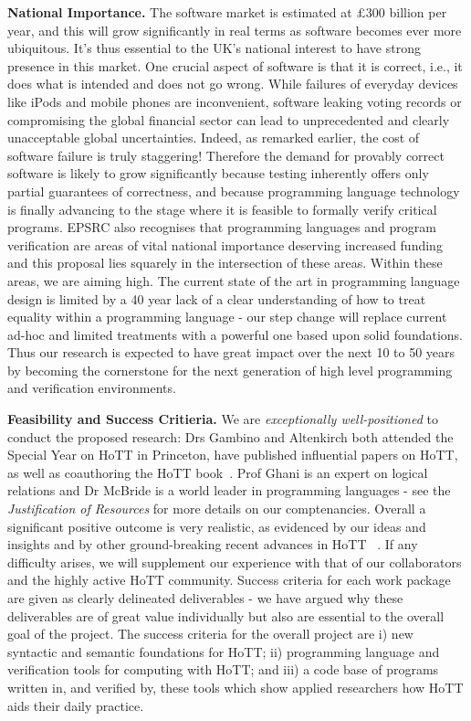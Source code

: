 \documentclass[a4paper,11pt]{article}
\begin{document}
{\bf National Importance.} The software market is estimated at
$\pounds 300$ billion per year, and this will grow significantly in
real terms as software becomes ever more ubiquitous. It's thus
essential to the UK's national interest to have strong presence in
this market. One crucial aspect of software is that it is correct,
i.e., it does what is intended and does not go wrong.  While failures of
everyday devices like iPods and mobile phones are inconvenient,
software leaking voting records or compromising the global financial
sector can lead to unprecedented and clearly unacceptable global
uncertainties. Indeed, as remarked earlier, the cost of software failure is
truly staggering!  Therefore the
demand for provably correct software is likely to grow significantly because testing inherently
offers only partial guarantees of correctness, and because
programming language technology is finally advancing to the stage
where it is feasible to formally verify critical programs.  EPSRC
also recognises that programming languages and program verification are
areas of vital national importance deserving increased funding and
this proposal lies squarely in the intersection of these areas. Within
these areas, we are aiming high.  The current state of the art in
programming language design is limited by a 40 year lack of a clear
understanding of how to treat equality within a programming language -
our step change will replace current ad-hoc and limited
treatments with a powerful one based upon solid foundations. Thus our
research is expected to have great impact 
over the next 10 to 50 years by becoming the
cornerstone for the next generation of high level programming and
verification environments.


{\bf Feasibility and Success Critieria.} 
We are {\em exceptionally
  well-positioned} to conduct the proposed research: Drs Gambino and
Altenkirch both attended the Special Year on HoTT in Princeton, have
published influential papers on HoTT, as well as coauthoring the HoTT
book~\cite{hott-book}. Prof Ghani is an expert on logical relations
and Dr McBride is a world leader in programming languages - see the
{\em Justification of Resources} for more details on our
comptenancies. Overall a significant positive outcome is very
realistic, as evidenced by our ideas and insights 
and by other ground-breaking recent advances in HoTT
~\cite{ShulmanM:uniidh,BezemM:cubsmt}. If any
difficulty arises, we will supplement our experience with that of our
collaborators and the highly active HoTT community. Success criteria
for each work package are given as clearly delineated deliverables -
we have argued why these deliverables are of great value individually
but also are essential to the overall goal of the project. The success
criteria for the overall project are i) new syntactic and semantic
foundations for HoTT; ii) programming language and verification tools
for computing with HoTT; and iii) a code base of programs written in,
and verified by, these tools which show applied researchers how HoTT
aids their daily practice.
\end{document}

